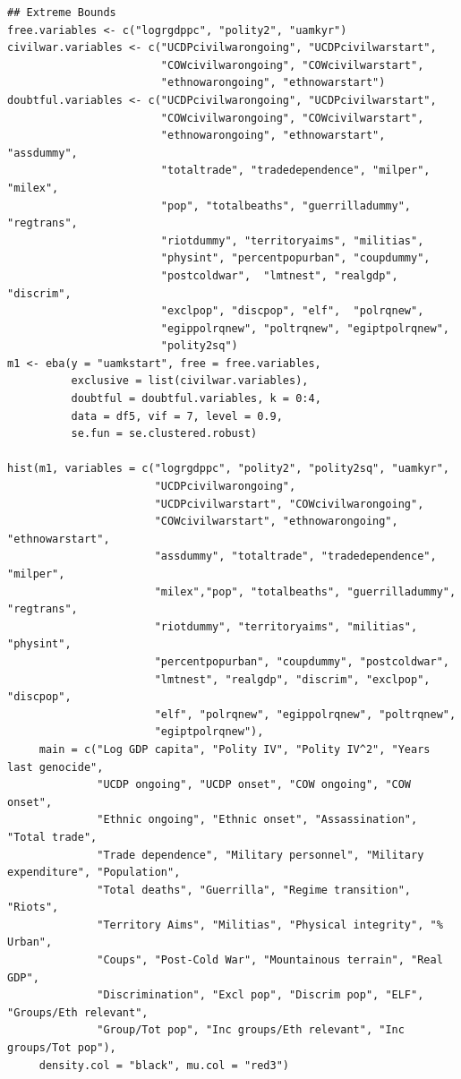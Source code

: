 \begin{verbatim}
## Extreme Bounds
free.variables <- c("logrgdppc", "polity2", "uamkyr")
civilwar.variables <- c("UCDPcivilwarongoing", "UCDPcivilwarstart",
                        "COWcivilwarongoing", "COWcivilwarstart",
                        "ethnowarongoing", "ethnowarstart")
doubtful.variables <- c("UCDPcivilwarongoing", "UCDPcivilwarstart",
                        "COWcivilwarongoing", "COWcivilwarstart",
                        "ethnowarongoing", "ethnowarstart", "assdummy",
                        "totaltrade", "tradedependence", "milper", "milex",
                        "pop", "totalbeaths", "guerrilladummy", "regtrans",
                        "riotdummy", "territoryaims", "militias",
                        "physint", "percentpopurban", "coupdummy",
                        "postcoldwar",  "lmtnest", "realgdp", "discrim",
                        "exclpop", "discpop", "elf",  "polrqnew",
                        "egippolrqnew", "poltrqnew", "egiptpolrqnew",
                        "polity2sq")
m1 <- eba(y = "uamkstart", free = free.variables,
          exclusive = list(civilwar.variables),
          doubtful = doubtful.variables, k = 0:4,
          data = df5, vif = 7, level = 0.9, 
          se.fun = se.clustered.robust)
          
hist(m1, variables = c("logrgdppc", "polity2", "polity2sq", "uamkyr",
                       "UCDPcivilwarongoing",
                       "UCDPcivilwarstart", "COWcivilwarongoing",
                       "COWcivilwarstart", "ethnowarongoing", "ethnowarstart",
                       "assdummy", "totaltrade", "tradedependence", "milper",
                       "milex","pop", "totalbeaths", "guerrilladummy", "regtrans",
                       "riotdummy", "territoryaims", "militias", "physint",
                       "percentpopurban", "coupdummy", "postcoldwar",
                       "lmtnest", "realgdp", "discrim", "exclpop", "discpop",
                       "elf", "polrqnew", "egippolrqnew", "poltrqnew",
                       "egiptpolrqnew"),
     main = c("Log GDP capita", "Polity IV", "Polity IV^2", "Years last genocide",
              "UCDP ongoing", "UCDP onset", "COW ongoing", "COW onset", 
              "Ethnic ongoing", "Ethnic onset", "Assassination", "Total trade", 
              "Trade dependence", "Military personnel", "Military expenditure", "Population", 
              "Total deaths", "Guerrilla", "Regime transition", "Riots",
              "Territory Aims", "Militias", "Physical integrity", "% Urban",
              "Coups", "Post-Cold War", "Mountainous terrain", "Real GDP",
              "Discrimination", "Excl pop", "Discrim pop", "ELF", "Groups/Eth relevant", 
              "Group/Tot pop", "Inc groups/Eth relevant", "Inc groups/Tot pop"),
     density.col = "black", mu.col = "red3")


\end{verbatim}

